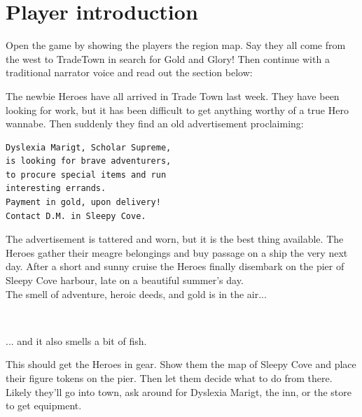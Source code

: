 \raggedbottom


\section*{Player introduction}

Open the game by showing the players the region map. Say they all come from the west to TradeTown in search for Gold and Glory! Then continue with a traditional narrator voice and read out the section below:

\begin{readoutloud}
The newbie Heroes have all arrived in Trade Town last week. They have been looking for work, but it has been difficult to get anything worthy of a true Hero wannabe.
Then suddenly they find an old advertisement proclaiming:

\small \begin{verbatim}
Dyslexia Marigt, Scholar Supreme,
is looking for brave adventurers,
to procure special items and run
interesting errands.
Payment in gold, upon delivery!
Contact D.M. in Sleepy Cove.
\end{verbatim} \normalsize

The advertisement is tattered and worn, but it is the best thing available. The Heroes gather their meagre belongings and buy passage on a ship the very next day. After a short and sunny cruise the Heroes finally disembark on the pier of Sleepy Cove harbour, late on a beautiful summer's day.\\
The smell of adventure, heroic deeds, and gold is in the air...

\

... and it also smells a bit of fish.
\end{readoutloud}


This should get the Heroes in gear. Show them the map of Sleepy Cove and place their figure tokens on the pier. Then let them decide what to do from there. Likely they'll go into town, ask around for Dyslexia Marigt, the inn, or the store to get equipment.


